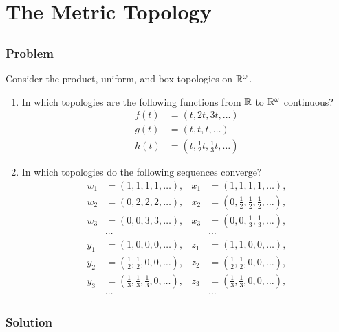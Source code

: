 \setcounter{section}{19} %
\section{The Metric Topology}
\label{sec-topspace-metric}
 

\setcounter{subsection}{3} %
\subsection{}

\subsubsection{Problem}

Consider the product, uniform, and box topologies on $\mathbb R^\omega$.
\begin{enumerate}
\item In which topologies are the following functions from $\mathbb R$ to $\mathbb R^\omega$ continuous?
\begin{align*}
f(t) &= (t, 2t, 3t, \ldots) \\
g(t) &= (t, t, t, \ldots) \\
h(t) &= (t, \tfrac12 t, \tfrac13 t, \ldots)
\end{align*}

\item In which topologies do the following sequences converge?
\begin{align*}
w_1 &= (1,1,1,1,\ldots),&  x_1 &=(1,1,1,1,\ldots), \\
w_2 &= (0,2,2,2,\ldots),&  x_2 &=(0,\tfrac12,\tfrac12,\tfrac12,\ldots), \\
w_3 &= (0,0,3,3, \ldots),& x_3 &=(0,0,\tfrac13,\tfrac13,\ldots), \\
&\cdots & &\cdots \\
y_1 &= (1,0,0,0,\ldots),& z_1 &=(1,1,0,0,\ldots), \\
y_2 &= (\tfrac12,\tfrac12,0,0,\ldots),& z_2 &=(\tfrac12,\tfrac12,0,0,\ldots), \\
y_3 &= (\tfrac13,\tfrac13,\tfrac13,0,\ldots),& z_3 &=(\tfrac13,\tfrac13,0,0,\ldots), \\
&\cdots & &\cdots
\end{align*}
\end{enumerate}

\subsubsection{Solution}

